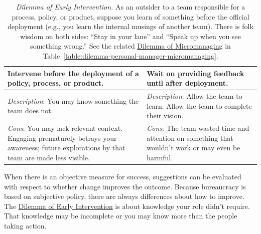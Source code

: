 \begin{center}
\begin{table}[H] %
\begin{tabular}{ | m{\dilemmatablewidth}| m{\dilemmatablewidth} | } 
  \hline
  \textbf{Intervene before the deployment of a policy, process, or product.} &
  \textbf{Wait on providing feedback until after deployment.} \\
  \hline
  \textit{Description}: You may know something the team does not. & 
  \textit{Description}: Allow the team to learn. Allow the team to complete their vision. \\
  \hline
  \textit{Cons}: You may lack relevant context. Engaging prematurely betrays your awareness; future explorations by that team are made less visible. & 
  \textit{Cons}: The team wasted time and attention on something that wouldn't work or may even be harmful. \\
  \hline
\end{tabular}
\caption{
\textit{Dilemma of Early Intervention.}
As an outsider to a team responsible for a process, policy, or product, suppose you learn of something before the official deployment (e.g., you learn the internal musings of another team). There is folk wisdom on both sides: 
``Stay in your lane''
%
and 
``Speak up when you see something wrong.''
%
See the related \hyperref[table:dilemma-personal-manager-micromanaging]{Dilemma of Micromanaging} in Table~\ref{table:dilemma-personal-manager-micromanaging}.}
\label{table:dilemma-personal-early-intervention}
\end{table}
\end{center}

When there is an objective measure for success, suggestions can be evaluated with respect to whether change improves the outcome. Because bureaucracy is based on subjective policy, there are always differences about how to improve. The \hyperref[table:dilemma-personal-early-intervention]{Dilemma of Early Intervention} 
\iftoggle{printedonpaper}{ (\ref{table:dilemma-personal-early-intervention}) }{}%
is about knowledge your role didn't require. That knowledge may be incomplete or you may know more than the people taking action. 



